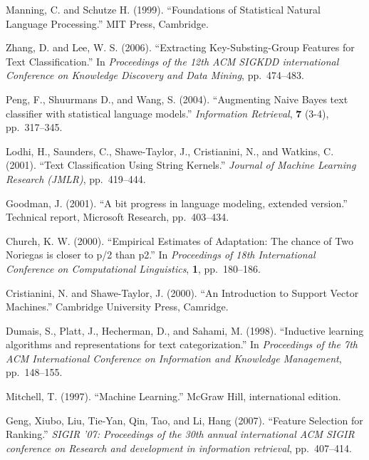 \documentclass[japanese]{jnlp_1.4}
\begin{document}

\begin{thebibliography}{}


\item
Manning, C. and Schutze H. (1999). ``Foundations of Statistical Natural 
Language Processing.'' MIT Press, Cambridge.

\item
Zhang, D. and Lee, W. S. (2006). ``Extracting Key-Substing-Group Features for 
Text Classification.'' In \textit{Proceedings of the 12th ACM SIGKDD international 
Conference on Knowledge Discovery and Data Mining}, pp.~474--483.

\item
Peng, F., Shuurmans D., and Wang, S. (2004). ``Augmenting Naive Bayes text 
classifier with statistical language models.'' \textit{Information Retrieval}, 
\textbf{7} (3-4), pp.~317--345.

\item
Lodhi, H., Saunders, C., Shawe-Taylor, J., Cristianini, N., and Watkins, C. 
(2001). ``Text Classification Using String Kernels.'' \textit{Journal of Machine 
Learning Research (JMLR)}, pp.~419--444.

\item
Goodman, J. (2001). ``A bit progress in language modeling, extended version.'' 
Technical report, Microsoft Research, pp.~403--434.

\item
Church, K. W. (2000). ``Empirical Estimates of Adaptation: The chance of Two 
Noriegas is closer to p/2 than p2.'' In \textit{Proceedings of 18th International 
Conference on Computational Linguistics}, \textbf{1}, pp.~180--186.

\item
Cristianini, N. and Shawe-Taylor, J. (2000). ``An Introduction to Support Vector 
Machines.'' Cambridge University Press, Camridge.

\item
Dumais, S., Platt, J., Hecherman, D., and Sahami, M. (1998). ``Inductive learning 
algorithms and representations for text categorization.'' In \textit{Proceedings of 
the 7th ACM International Conference on Information and Knowledge 
Management}, pp.~148--155.

\item
Mitchell, T. (1997). ``Machine Learning.'' McGraw Hill, international edition.

\item
Geng, Xiubo, Liu, Tie-Yan, Qin, Tao, and Li, Hang (2007). ``Feature Selection for 
Ranking.'' \textit{SIGIR '07: Proceedings of the 30th annual international ACM SIGIR 
conference on Research and development in information retrieval}, pp.~407--414.


\end{thebibliography}
\end{document}
